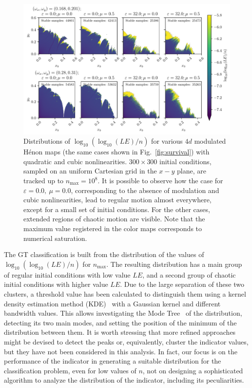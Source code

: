 \begin{figure}[htp]
    \centering
    \includegraphics[width=\textwidth]{6_dynamic_indicators/fig/gt_example_colormap.pdf}
    \caption{Distributions of $\log_{10}(\log_{10}(LE)/n)$ for various $4d$ modulated Hénon maps (the same cases shown in Fig.~\ref{fig:survival}) with quadratic and cubic nonlinearities. $300\times300$ initial conditions, sampled on an uniform Cartesian grid in the $x-y$ plane, are tracked up to $n_\text{max}=10^8$. It is possible to observe how the case for $\varepsilon=0.0,\ \mu=0.0$, corresponding to the absence of modulation and cubic nonlinearities, lead to regular motion almost everywhere, except for a small set of initial conditions. For the other cases, extended regions of chaotic motion are visible. Note that the maximum value registered in the color maps corresponds to numerical saturation.}
    \label{fig:ground_truth_bis}
\end{figure}

The GT classification is built from the distribution of the values of $\log_{10}(\log_{10}(LE)/n)$ for $n_\text{max}$. The resulting distribution has a main group of regular initial conditions with low value $LE$, and a second group of chaotic initial conditions with higher value $LE$. Due to the large separation of these two clusters, a threshold value has been calculated to distinguish them using a kernel density estimation method (KDE)~\cite{doi:10.1080/24709360.2017.1396742, refId0} with a Gaussian kernel and different bandwidth values. This allows investigating the Mode Tree~\cite{10.2307/1390955} of the distribution, detecting its two main modes, and setting the position of the minimum of the distribution between them. It is worth stressing that more refined approaches might be devised to detect the peaks or, equivalently, cluster the indicator values, but they have not been considered in this analysis. In fact, our focus is on the performance of the indicator in generating a suitable distribution for the classification problem, even for low values of $n$, not on designing a sophisticated algorithm to analyze the distribution of the indicator, including its peculiarities.

